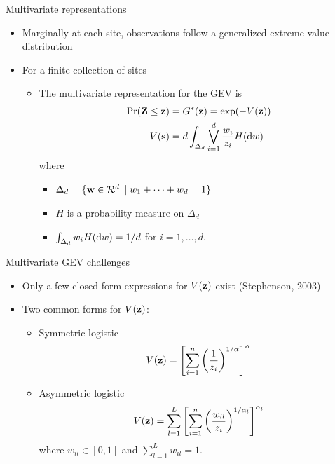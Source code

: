 \documentclass{beamer}
\begin{document}
\begin{frame}{Multivariate representations}
  \begin{itemize}
    \item Marginally at each site, observations follow a generalized extreme value distribution
    \item For a finite collection of sites
    \begin{itemize}
      \item The multivariate representation for the GEV is
      \begin{align*}
        \Pr(\mbox{\bf Z} \le \mbox{\bf z})  &= G^*(\mbox{\bf z}) = \exp(-V(\mbox{\bf z}))\\
                V(\mbox{\bf s})    &= d \int_{\Delta_d} \bigvee_{i = 1}^d \frac{w_i}{z_i} H(\text{d} w)
      \end{align*}
      where
      \begin{itemize}
        \item $\Delta_d = \{ \mbox{\bf w} \in {\cal R}^d_+ \mid w_1 + \cdots + w_d = 1\}$
        \item $H$ is a probability measure on $\Delta_d$
        \item $\int_{\Delta_d}w_i H(\text{d} w) = 1 / d$ for $i = 1, \ldots, d$.
      \end{itemize}
    \end{itemize}
  \end{itemize}
\end{frame}

\begin{frame}{Multivariate GEV challenges}
  \begin{itemize}
    \item Only a few closed-form expressions for $V(\mbox{\bf z})$ exist (Stephenson, 2003)
    \item Two common forms for $V(\mbox{\bf z})$:
    \begin{itemize}
      \item Symmetric logistic
      \begin{align*}
        V(\mbox{\bf z}) = \left[\sum_{i = 1}^n \left( \frac{ 1 }{ z_i } \right)^{1/\alpha}\right]^\alpha
      \end{align*}
      \item Asymmetric logistic
      \begin{align*}
        V(\mbox{\bf z}) = \sum_{l = 1}^L \left[\sum_{i = 1}^n \left(\frac{w_{il}}{z_i} \right)^{1 / \alpha_l} \right]^{\alpha_l}
      \end{align*}
      where $w_{il} \in [0, 1]$ and $\sum_{l = 1}^L w_{il} = 1$.
    \end{itemize}
  \end{itemize}
\end{frame}
\end{document}
